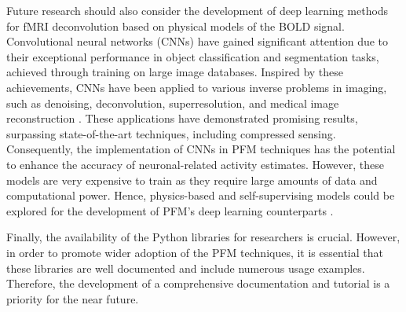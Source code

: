 Future research should also consider the development of deep learning methods
for fMRI deconvolution based on physical models of the BOLD signal.
Convolutional neural networks (CNNs) have gained significant attention due to
their exceptional performance in object classification and segmentation tasks,
achieved through training on large image databases. Inspired by these
achievements, CNNs have been applied to various inverse problems in
imaging, such as denoising, deconvolution, superresolution, and medical image
reconstruction
\citep{McCann2017ConvolutionalNeuralNetworks,Wang2020Multiresolutionconvolutional}.
These applications have demonstrated promising results, surpassing
state-of-the-art techniques, including compressed sensing. Consequently, the
implementation of CNNs in PFM techniques has the potential to enhance the
accuracy of neuronal-related activity estimates. However, these models are very
expensive to train as they require large amounts of data and computational
power. Hence, physics-based and self-supervising models could be explored for
the development of PFM's deep learning counterparts
\citep{Lucas2018UsingDeepNeural,LopezTapia2021Deeplearningapproaches,Hammernik2023PhysicsDrivenDeep,Aggarwal2019MoDLModelBased}.

Finally, the availability of the Python libraries for researchers is crucial.
However, in order to promote wider adoption of the PFM techniques, it is
essential that these libraries are well documented and include numerous usage
examples. Therefore, the development of a comprehensive documentation and
tutorial is a priority for the near future.
